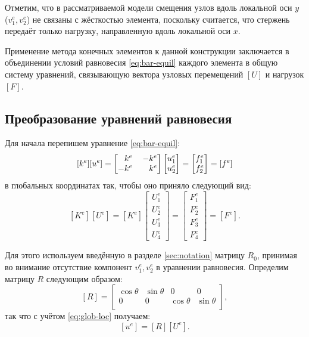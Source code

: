 \documentclass[10pt]{article}
\numberwithin{equation}{section}
\newcommand{\matr}[1]{[#1]}
\newcommand{\mm}{\llap{$-$}}
\newcommand{\phm}{\phantom{-}}
\begin{document}
Отметим, что в рассматриваемой модели смещения узлов вдоль локальной
оси $y$ ($v_1^e, v_2^e$) не связаны с жёсткостью элемента, поскольку
считается, что стержень передаёт только нагрузку, направленную вдоль
локальной оси $x$.

Применение метода конечных элементов к данной конструкции заключается
в объединении условий равновесия \eqref{eq:bar-equil} каждого элемента
в общую систему уравнений, связывающую вектора узловых перемещений
$\matr{U}$ и нагрузок $\matr{F}$.

\subsection{Преобразование уравнений равновесия}

Для начала перепишем уравнение \eqref{eq:bar-equil}:
\begin{equation}
  \label{eq:bar-element-equil}
  \matr{k^e}\matr{u^e}=
  \begin{bmatrix}
    \phm{}k^e&& \mm k^e\\
    -k^e && k^e    
  \end{bmatrix}
  \begin{bmatrix}
    u_1^e\\
    u_2^e
  \end{bmatrix}
  =
  \begin{bmatrix}
    f_1^e\\
    f_2^e
  \end{bmatrix}=\matr{f^e}
\end{equation}
в глобальных координатах так, чтобы оно приняло следующий вид:
\begin{equation}
  \label{eq:target-equil}
  \matr{K^e}\matr{U^e}=\matr{K^e}
  \begin{bmatrix}
    U_1^e\\
    U_2^e\\
    U_3^e\\
    U_4^e
  \end{bmatrix}
  =
  \begin{bmatrix}
    F_1^e\\
    F_2^e\\
    F_3^e\\
    F_4^e
  \end{bmatrix}=\matr{F^e}.
\end{equation}

Для этого используем введённую в разделе \ref{sec:notation} матрицу
$R_0$, принимая во внимание отсутствие компонент $v_1^e, v_2^e$ в
уравнении равновесия. Определим матрицу $R$ следующим образом:
\begin{equation}
  \label{eq:short-rotmatrix}
  \matr{R} =
  \begin{bmatrix}
    \cos\theta & \sin\theta & 0 & 0 \\
    0 & 0 & \cos\theta & \sin\theta \\
  \end{bmatrix},
\end{equation}
так что с учётом \eqref{eq:glob-loc} получаем:
\begin{equation}
  \label{eq:short-glob-loc}
  \matr{u^e} = \matr{R}\matr{U^e}.
\end{equation}
\end{document}

